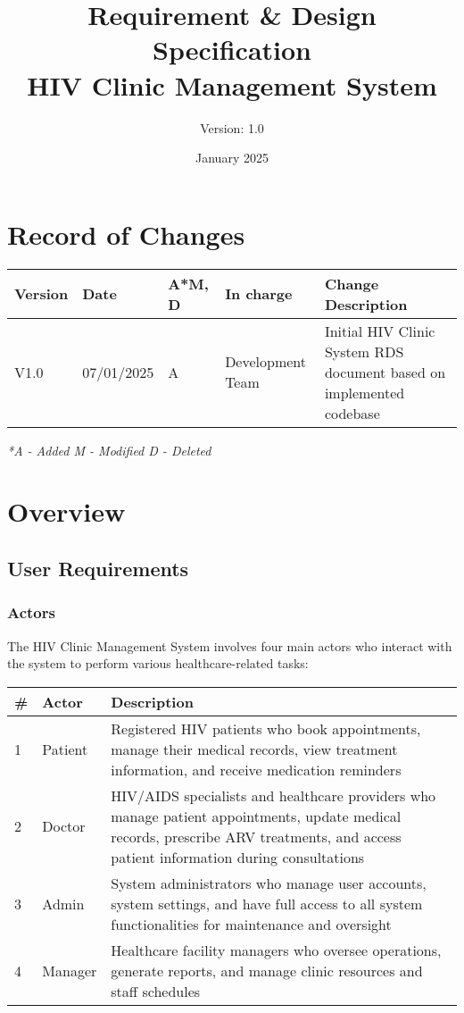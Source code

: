 \documentclass[12pt,a4paper]{article}
\title{\textbf{Requirement \& Design Specification\\HIV Clinic Management System}}
\author{Version: 1.0}
\date{January 2025}
\begin{document}
\maketitle
\thispagestyle{empty}

\newpage

\section*{Record of Changes}

\begin{longtable}{|p{2cm}|p{2cm}|p{1cm}|p{3cm}|p{6cm}|}
\hline
\textbf{Version} & \textbf{Date} & \textbf{A*M, D} & \textbf{In charge} & \textbf{Change Description} \\
\hline
V1.0 & 07/01/2025 & A & Development Team & Initial HIV Clinic System RDS document based on implemented codebase \\
\hline
\end{longtable}

\textit{*A - Added M - Modified D - Deleted}

\newpage

\tableofcontents

\newpage

\section{Overview}

\subsection{User Requirements}

\subsubsection{Actors}

The HIV Clinic Management System involves four main actors who interact with the system to perform various healthcare-related tasks:

\begin{longtable}{|p{1cm}|p{3cm}|p{10cm}|}
\hline
\textbf{\#} & \textbf{Actor} & \textbf{Description} \\
\hline
1 & Patient & Registered HIV patients who book appointments, manage their medical records, view treatment information, and receive medication reminders \\
\hline
2 & Doctor & HIV/AIDS specialists and healthcare providers who manage patient appointments, update medical records, prescribe ARV treatments, and access patient information during consultations \\
\hline
3 & Admin & System administrators who manage user accounts, system settings, and have full access to all system functionalities for maintenance and oversight \\
\hline
4 & Manager & Healthcare facility managers who oversee operations, generate reports, and manage clinic resources and staff schedules \\
\hline
\end{longtable}
\end{document}
